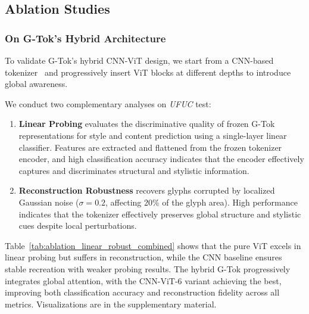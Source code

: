 \subsection{Ablation Studies}
\subsubsection{On G-Tok's Hybrid Architecture}
To validate G-Tok's hybrid CNN-ViT design, we start from a CNN-based tokenizer~\cite{llamagen} and progressively insert ViT blocks at different depths to introduce global awareness.

We conduct two complementary analyses on \textit{UFUC} test:
\begin{enumerate}
\item \textbf{Linear Probing} evaluates the discriminative quality of frozen G-Tok representations for style and content prediction using a single-layer linear classifier. Features are extracted and flattened from the frozen tokenizer encoder, and high classification accuracy indicates that the encoder effectively captures and discriminates structural and stylistic information.
\item \textbf{Reconstruction Robustness} recovers glyphs corrupted by localized Gaussian noise ($\sigma = 0.2$, affecting 20\% of the glyph area). High performance indicates that the tokenizer effectively preserves global structure and stylistic cues despite local perturbations.
\end{enumerate}
Table~\ref{tab:ablation_linear_robust_combined} shows that the pure ViT excels in linear probing but suffers in reconstruction, while the CNN baseline ensures stable recreation with weaker probing results. The hybrid G-Tok progressively integrates global attention, with the CNN-ViT-6 variant achieving the best, improving both classification accuracy and reconstruction fidelity across all metrics. Visualizations are in the supplementary material.


